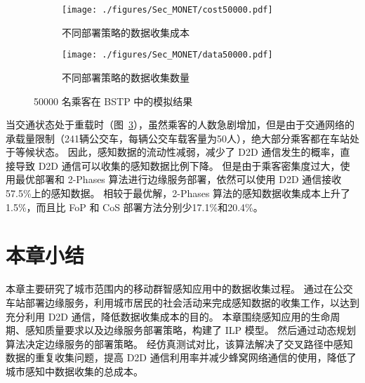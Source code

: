 \begin{figure}[!h]
  \centering
  \begin{subfigure}[b]{0.45\linewidth}
    \texttt{[image: ./figures/Sec\_MONET/cost50000.pdf]}
    \label{fig_cost50000}
    \vspace{-2em}
    \caption{不同部署策略的数据收集成本}
  \end{subfigure}
  \begin{subfigure}[b]{0.45\linewidth}
    \texttt{[image: ./figures/Sec\_MONET/data50000.pdf]}
    \label{fig_data50000}
    \vspace{-2em}
    \caption{不同部署策略的数据收集数量}
  \end{subfigure}
    \vspace{-0.5em}
    \caption{50000 名乘客在 BSTP 中的模拟结果}
  \label{fig_50000}
\end{figure}

当交通状态处于重载时（图~\ref{fig_50000}），虽然乘客的人数急剧增加，但是由于交通网络的承载量限制（241辆公交车，每辆公交车载客量为50人），绝大部分乘客都在车站处于等候状态。
因此，感知数据的流动性减弱，减少了 D2D 通信发生的概率，直接导致 D2D 通信可以收集的感知数据比例下降。
但是由于乘客密集度过大，使用最优部署和 2-Phases 算法进行边缘服务部署，依然可以使用 D2D 通信接收57.5\%上的感知数据。
相较于最优解，2-Phases 算法的感知数据收集成本上升了1.5\%，而且比 FoP 和 CoS 部署方法分别少17.1\%和20.4\%。

\section{本章小结}

本章主要研究了城市范围内的移动群智感知应用中的数据收集过程。
通过在公交车站部署边缘服务，利用城市居民的社会活动来完成感知数据的收集工作，以达到充分利用 D2D 通信，降低数据收集成本的目的。
本章围绕感知应用的生命周期、感知质量要求以及边缘服务部署策略，构建了 ILP 模型。
然后通过动态规划算法决定边缘服务的部署策略。
经仿真测试对比，该算法解决了交叉路径中感知数据的重复收集问题，提高 D2D 通信利用率并减少蜂窝网络通信的使用，降低了城市感知中数据收集的总成本。

